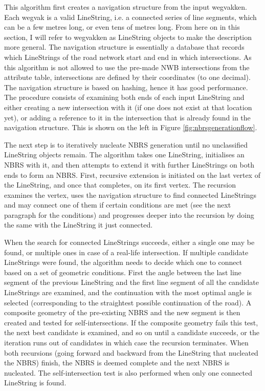 This algorithm first creates a navigation structure from the input wegvakken. Each wegvak is a valid LineString, i.e. a connected series of line segments, which can be a few metres long, or even tens of metres long. From here on in this section, I will refer to wegvakken as LineString objects to make the description more general. The navigation structure is essentially a database that records which LineStrings of the road network start and end in which intersections. As this algorithm is not allowed to use the pre-made NWB intersections from the attribute table, intersections are defined by their coordinates (to one decimal). The navigation structure is based on hashing, hence it has good performance. The procedure consists of examining both ends of each input LineString and either creating a new intersection with it (if one does not exist at that location yet), or adding a reference to it in the intersection that is already found in the navigation structure. This is shown on the left in Figure \ref{fig:nbrsgenerationflow}.

The next step is to iteratively nucleate NBRS generation until no unclassified LineString objects remain. The algorithm takes one LineString, initialises an NBRS with it, and then attempts to extend it with further LineStrings on both ends to form an NBRS. First, recursive extension is initiated on the last vertex of the LineString, and once that completes, on its first vertex. The recursion examines the vertex, uses the navigation structure to find connected LineStrings and may connect one of them if certain conditions are met (see the next paragraph for the conditions) and progresses deeper into the recursion by doing the same with the LineString it just connected.

When the search for connected LineStrings succeeds, either a single one may be found, or multiple ones in case of a real-life intersection. If multiple candidate LineStrings were found, the algorithm needs to decide which one to connect based on a set of geometric conditions. First the angle between the last line segment of the previous LineString and the first line segment of all the candidate LineStrings are examined, and the continuation with the most optimal angle is selected (corresponding to the straightest possible continuation of the road). A composite geometry of the pre-existing NBRS and the new segment is then created and tested for self-intersections. If the composite geometry fails this test, the next best candidate is examined, and so on until a candidate succeeds, or the iteration runs out of candidates in which case the recursion terminates. When both recursions (going forward and backward from the LineString that nucleated the NBRS) finish, the NBRS is deemed complete and the next NBRS is nucleated. The self-intersection test is also performed when only one connected LineString is found.

